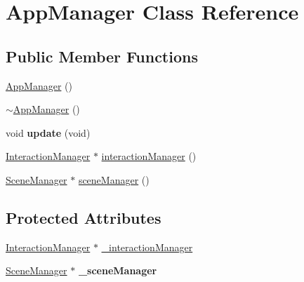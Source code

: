 \hypertarget{class_app_manager}{
\section{AppManager Class Reference}
\label{class_app_manager}
}
\subsection*{Public Member Functions}
\begin{DoxyCompactItemize}
\item 
\hyperlink{class_app_manager_a6221fc1ede71f2ac539c052bbe0c7f6a}{AppManager} ()
\item 
\hyperlink{class_app_manager_aee444cb63c8febdbf5ea3fcbf1a90836}{$\sim$AppManager} ()
\item 
\hypertarget{class_app_manager_a99cb0ef8e173f0dedaa3286039b88aba}{
void {\bfseries update} (void)}
\label{class_app_manager_a99cb0ef8e173f0dedaa3286039b88aba}

\item 
\hyperlink{class_interaction_manager}{InteractionManager} $\ast$ \hyperlink{class_app_manager_ae275684d47ade6cea794d26d6fbfd6ae}{interactionManager} ()
\item 
\hyperlink{class_scene_manager}{SceneManager} $\ast$ \hyperlink{class_app_manager_a6b5b1ca7d03db568e57104fcdd25c7e6}{sceneManager} ()
\end{DoxyCompactItemize}
\subsection*{Protected Attributes}
\begin{DoxyCompactItemize}
\item 
\hyperlink{class_interaction_manager}{InteractionManager} $\ast$ \hyperlink{class_app_manager_a1b14712d9464915505b8e5b2153e76de}{\_\-interactionManager}
\item 
\hypertarget{class_app_manager_a5cb0c0aae63ea1f857e3f09bcac8fa31}{
\hyperlink{class_scene_manager}{SceneManager} $\ast$ {\bfseries \_\-sceneManager}}
\label{class_app_manager_a5cb0c0aae63ea1f857e3f09bcac8fa31}

\end{DoxyCompactItemize}


